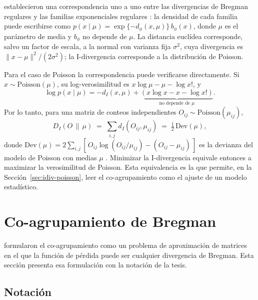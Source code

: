 \cite{Banerjee2005} establecieron una correspondencia uno a uno entre las
divergencias de Bregman regulares y las familias exponenciales regulares
\cite[Teoremas~4 y~6]{Banerjee2005}: la densidad de cada familia puede escribirse
como $p(x \mid \mu) = \exp\{-d_\phi(x, \mu)\}\, b_\phi(x)$, donde $\mu$ es el
parámetro de media y $b_\phi$ no depende de $\mu$. La distancia euclídea
corresponde, salvo un factor de escala, a la normal con varianza fija
$\sigma^2$, cuya divergencia es $\lVert x - \mu \rVert^2 / (2\sigma^2)$; la
I-divergencia corresponde a la distribución de Poisson.

Para el caso de Poisson la correspondencia puede verificarse directamente. Si
$x \sim \mathrm{Poisson}(\mu)$, su log-verosimilitud es
$x \log \mu - \mu - \log x!$, y
\begin{equation}
  \log p(x \mid \mu) = -d_I(x, \mu) + \underbrace{\left( x \log x - x - \log x! \right)}_{\text{no depende de } \mu}.
\end{equation}
Por lo tanto, para una matriz de conteos independientes $O_{ij} \sim
\mathrm{Poisson}(\mu_{ij})$,
\begin{equation}\label{eq:devianza}
  D_I(O \,\|\, \mu) \;=\; \sum_{i,j} d_I(O_{ij}, \mu_{ij}) \;=\; \tfrac{1}{2}\, \mathrm{Dev}(\mu),
\end{equation}
donde $\mathrm{Dev}(\mu) = 2 \sum_{i,j} [\, O_{ij} \log (O_{ij}/\mu_{ij}) - (O_{ij} - \mu_{ij}) \,]$
es la devianza del modelo de Poisson con medias $\mu$
\cite[Sec.~4.5.2, ec.~4.34]{Agresti2013}. Minimizar la I-divergencia equivale
entonces a maximizar la verosimilitud de Poisson. Esta equivalencia es la que
permite, en la Sección~\ref{sec:idiv-poisson}, leer el co-agrupamiento como el
ajuste de un modelo estadístico.

\section{Co-agrupamiento de Bregman}\label{sec:bbac}

\cite{Banerjee2007} formularon el co-agrupamiento como un problema de aproximación
de matrices en el que la función de pérdida puede ser cualquier divergencia de
Bregman. Esta sección presenta esa formulación con la notación de la tesis.

\subsection{Notación}

